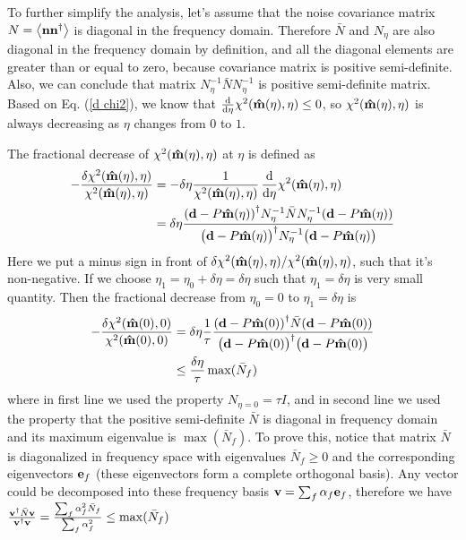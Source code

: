 \documentclass[11pt, letterpaper]{article}
\newcommand{\vbd}{\vb{d}}
\newcommand{\vbn}{\vb{n}}
\newcommand{\inv}[1]{#1^{-1}}
\newcommand{\hatm}{\vb{\hat{m}}}
\newcommand{\Nbar}{\bar{N}}
\newcommand{\Neta}{N_{\eta}}
\begin{document}
To further simplify the analysis, let's assume that the noise covariance matrix
$N = \ev{\vbn\vbn^{\dagger}}$ is diagonal in the frequency domain.
Therefore $\Nbar$ and $\Neta$ are also diagonal in the frequency domain by
definition, and all the diagonal elements are greater than or equal to zero,
because covariance matrix is positive semi-definite.
Also, we can conclude that matrix
$\inv{\Neta} \Nbar \inv{\Neta}$ is positive semi-definite matrix.
Based on Eq. (\ref{d chi2}), we know that
$\dv{\eta} \chi^2({\hatm(\eta), \eta}) \leq 0$,
so $\chi^2(\hatm(\eta), \eta)$ is always decreasing
as $\eta$ changes from $0$ to $1$.

The fractional decrease of $\chi^2(\hatm(\eta), \eta)$ at $\eta$ is defined as
\begin{align}
\begin{aligned}[b]
-\frac{\delta \chi^2(\hatm(\eta),\eta)} {\chi^2(\hatm(\eta), \eta)}
&=
-\delta \eta \frac{1}{\chi^2(\hatm(\eta), \eta)} \, 
\dv{\eta} \chi^2(\hatm(\eta), \eta) 
\\&= 
\delta \eta 
\frac{\qty(\vbd - P\hatm(\eta))^{\dagger}
    \inv{\Neta} \Nbar \inv{\Neta}
    (\vbd - P\hatm(\eta)) 
}
{\qty\big(\vbd - P \hatm(\eta))^{\dagger} 
    \inv{\Neta}
    \qty\big(\vbd - P\hatm(\eta))
}
\end{aligned}
\end{align}
Here we put a minus sign in front of
$\delta\chi^2(\hatm(\eta), \eta)/\chi^2(\hatm(\eta), \eta)$,
such that it's non-negative.
If we choose $\eta_1 = \eta_0 + \delta\eta = \delta\eta$
such that $\eta_1 = \delta \eta$ is very small quantity.
Then the fractional decrease from $\eta_0= 0$ to $\eta_1 = \delta \eta$ is
\begin{align}
\begin{aligned}[b]
-\frac{\delta \chi^2(\hatm(0), 0)}{\chi^2(\hatm(0), 0)} 
&= \delta \eta 
\frac{1}{\tau}
\frac{\qty(\vbd - P\hatm(0))^{\dagger} \Nbar  (\vbd - P\hatm(0)) }
    {\qty\big(\vbd - P \hatm(0))^{\dagger} \qty\big(\vbd - P\hatm(0))}
\\
& \leq  \frac{\delta \eta}{\tau} \max(\Nbar_f)
\end{aligned}
\end{align}
where in first line we used the property $N_{\eta=0} = \tau I$,
and in second line we used the property that the positive semi-definite $\Nbar$ is diagonal in frequency 
domain and its maximum eigenvalue is $\max(\Nbar_f)$.
To prove this, notice that matrix $\Nbar$ is diagonalized in frequency space 
with eigenvalues $\Nbar_f\geq0$ and the corresponding eigenvectors $\vb{e}_f$
(these eigenvectors form a complete orthogonal basis).
Any vector could be decomposed into these frequency basis
$\vb{v} = \sum_f \alpha_f \vb{e}_f$, therefore we have
$\frac{\vb{v}^{\dagger} \Nbar \vb{v}}{\vb{v}^{\dagger} \vb{v}} 
= \frac{\sum_f \alpha_f^2\Nbar_f}{\sum_f \alpha_f^2}
\leq \max(\Nbar_f) $
\end{document}
